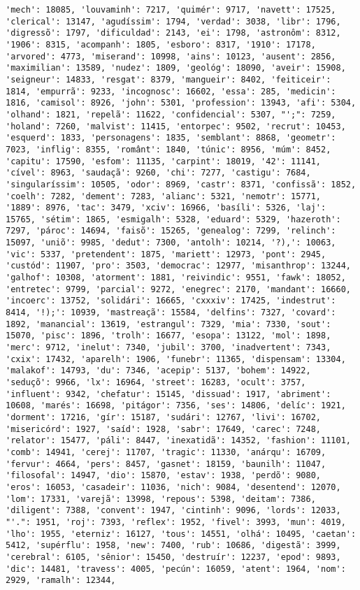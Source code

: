 \begin{Verbatim}[commandchars=\\\{\}]
'mech': 18085, 'louvaminh': 7217, 'quimér': 9717, 'navett': 17525, 'clerical': 13147, 'agudíssim': 1794, 'verdad': 3038, 'libr': 1796, 'digressõ': 1797, 'dificuldad': 2143, 'ei': 1798, 'astronôm': 8312, '1906': 8315, 'acompanh': 1805, 'esboro': 8317, '1910': 17178, 'arvored': 4773, 'miserand': 10998, 'ains': 10123, 'ausent': 2856, 'maximilian': 13589, 'nudez': 1809, 'geológ': 18090, 'aveir': 15908, 'seigneur': 14833, 'resgat': 8379, 'mangueir': 8402, 'feiticeir': 1814, 'empurrã': 9233, 'incognosc': 16602, 'essa': 285, 'medicin': 1816, 'camisol': 8926, 'john': 5301, 'profession': 13943, 'afi': 5304, 'olhand': 1821, 'repelã': 11622, 'confidencial': 5307, "';": 7259, 'holand': 7260, 'malvist': 11415, 'entorpec': 9502, 'recrut': 10453, 'esquerd': 1833, 'personagens': 1835, 'semblant': 8868, 'geometr': 7023, 'inflig': 8355, 'românt': 1840, 'túnic': 8956, 'múm': 8452, 'capitu': 17590, 'esfom': 11135, 'carpint': 18019, '42': 11141, 'cível': 8963, 'saudaçã': 9260, 'chi': 7277, 'castigu': 7684, 'singularíssim': 10505, 'odor': 8969, 'castr': 8371, 'confissã': 1852, 'coelh': 7282, 'dement': 7283, 'alianc': 5321, 'nemotr': 15771, '1889': 8976, 'tac': 3479, 'xciv': 16966, 'basíli': 5326, 'laj': 15765, 'sétim': 1865, 'esmigalh': 5328, 'eduard': 5329, 'hazeroth': 7297, 'pároc': 14694, 'faisõ': 15265, 'genealog': 7299, 'relinch': 15097, 'uniõ': 9985, 'dedut': 7300, 'antolh': 10214, '?),': 10063, 'vic': 5337, 'pretendent': 1875, 'mariett': 12973, 'pont': 2945, 'custód': 11907, 'pro': 3503, 'democrac': 12977, 'misanthrop': 13244, 'galhof': 10308, 'atorment': 1881, 'reivindic': 9551, 'fawk': 18052, 'entretec': 9799, 'parcial': 9272, 'enegrec': 2170, 'mandant': 16660, 'incoerc': 13752, 'solidári': 16665, 'cxxxiv': 17425, 'indestrut': 8414, '!);': 10939, 'mastreaçã': 15584, 'delfins': 7327, 'covard': 1892, 'manancial': 13619, 'estrangul': 7329, 'mia': 7330, 'sout': 15070, 'pisc': 1896, 'trolh': 16677, 'esopa': 13122, 'mol': 1898, 'merc': 9712, 'inelut': 7340, 'jubil': 3700, 'inadvertent': 7343, 'cxix': 17432, 'aparelh': 1906, 'funebr': 11365, 'dispensam': 13304, 'malakof': 14793, 'du': 7346, 'acepip': 5137, 'bohem': 14922, 'seduçõ': 9966, 'lx': 16964, 'street': 16283, 'ocult': 3757, 'influent': 9342, 'chefatur': 15145, 'dissuad': 1917, 'abriment': 10608, 'marés': 16698, 'pitágor': 7356, 'ses': 14806, 'delíc': 1921, 'dorment': 17216, 'gír': 15187, 'sudári': 12767, 'livi': 16702, 'misericórd': 1927, 'saíd': 1928, 'sabr': 17649, 'carec': 7248, 'relator': 15477, 'páli': 8447, 'inexatidã': 14352, 'fashion': 11101, 'comb': 14941, 'cerej': 11707, 'tragic': 11330, 'anárqu': 16709, 'fervur': 4664, 'pers': 8457, 'gasnet': 18159, 'baunilh': 11047, 'filosofal': 14947, 'dio': 15870, 'estav': 1938, 'perdõ': 9080, 'eros': 16053, 'casadeir': 11036, 'nich': 9084, 'desentend': 12070, 'lom': 17331, 'varejã': 13998, 'repous': 5398, 'deitam': 7386, 'diligent': 7388, 'convent': 1947, 'cintinh': 9096, 'lords': 12033, "'.": 1951, 'roj': 7393, 'reflex': 1952, 'fivel': 3993, 'mun': 4019, 'lho': 1955, 'eterniz': 16127, 'tous': 14551, 'olhá': 10495, 'caetan': 5412, 'supérflu': 1958, 'new': 7400, 'rub': 10686, 'digestã': 3999, 'cerebral': 6105, 'sênior': 15450, 'destruír': 12237, 'epod': 9893, 'dic': 14481, 'travess': 4005, 'pecún': 16059, 'atent': 1964, 'nom': 2929, 'ramalh': 12344, 
\end{Verbatim}
